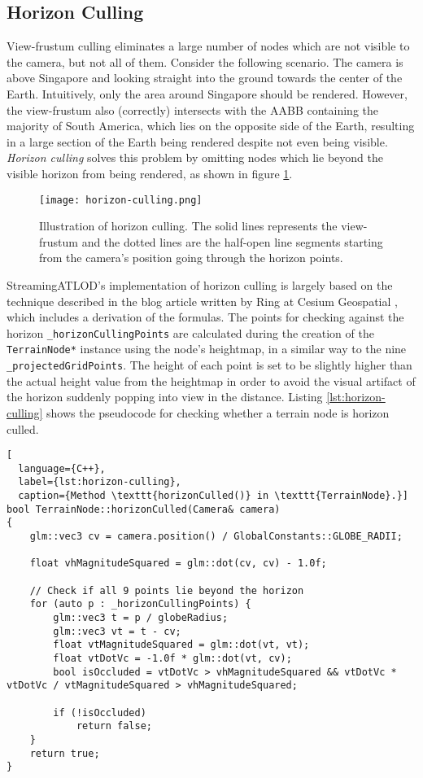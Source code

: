 \subsection{Horizon Culling}
View-frustum culling eliminates a large number of nodes which are not visible to the camera, but not all of them.
Consider the following scenario. The camera is above Singapore and looking straight into the ground towards 
the center of the Earth. Intuitively, only the area around Singapore should be rendered. However, the view-frustum also (correctly) intersects 
with the AABB containing the majority of South America, which lies on the opposite side of the Earth, 
resulting in a large section of the Earth being rendered despite not even being visible.
\textit{Horizon culling} solves this problem by omitting nodes which lie beyond the visible horizon from being rendered,
as shown in figure \ref{fig:horizon-culling}.

\begin{figure}[H]
  \centering
  \texttt{[image: horizon-culling.png]}
  \caption{Illustration of horizon culling. The solid lines represents the view-frustum and the dotted lines are the half-open line segments 
  starting from the camera's position going through the horizon points.}\label{fig:horizon-culling}
\end{figure}

StreamingATLOD's implementation of horizon culling is largely based on the technique described in the
blog article written by Ring at Cesium Geospatial \cite{horizonculling}, which includes a derivation of 
the formulas.
The points for checking against the horizon \texttt{\_horizonCullingPoints} are calculated during the creation 
of the \texttt{TerrainNode*} instance using the node's heightmap, in a similar way 
to the nine \texttt{\_projectedGridPoints}.
The height of each point is set to be slightly higher than the actual 
height value from the heightmap in order to avoid the visual artifact 
of the horizon suddenly popping into view in the distance.
Listing \ref{lst:horizon-culling} shows the pseudocode for checking 
whether a terrain node is horizon culled.

\begin{lstlisting}[
  language={C++},
  label={lst:horizon-culling},
  caption={Method \texttt{horizonCulled()} in \texttt{TerrainNode}.}]
bool TerrainNode::horizonCulled(Camera& camera)
{
    glm::vec3 cv = camera.position() / GlobalConstants::GLOBE_RADII;

    float vhMagnitudeSquared = glm::dot(cv, cv) - 1.0f;

    // Check if all 9 points lie beyond the horizon
    for (auto p : _horizonCullingPoints) {
        glm::vec3 t = p / globeRadius;
        glm::vec3 vt = t - cv;
        float vtMagnitudeSquared = glm::dot(vt, vt);
        float vtDotVc = -1.0f * glm::dot(vt, cv);
        bool isOccluded = vtDotVc > vhMagnitudeSquared && vtDotVc * vtDotVc / vtMagnitudeSquared > vhMagnitudeSquared;

        if (!isOccluded)
            return false;
    }
    return true;
}
\end{lstlisting}

